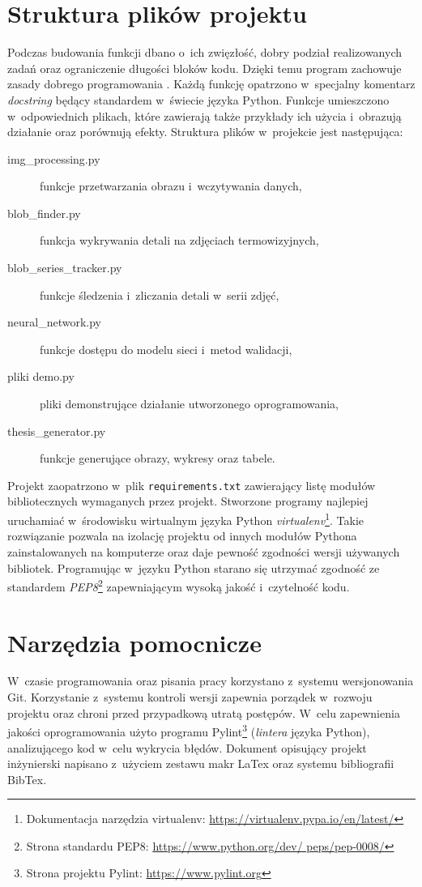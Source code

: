 \section{Struktura plików projektu}
Podczas budowania funkcji dbano o~ich zwięzłość, dobry podział realizowanych
zadań oraz ograniczenie długości bloków kodu.
Dzięki temu program zachowuje zasady dobrego programowania \cite{martin_code}.
Każdą funkcję opatrzono w~specjalny komentarz \emph{docstring} będący
standardem w~świecie języka Python.
Funkcje umieszczono w~odpowiednich plikach, które zawierają także
przykłady ich użycia i~obrazują działanie oraz porównują efekty.
Struktura plików w~projekcie jest następująca:
\begin{description}
	\item[img\_processing.py]
	funkcje przetwarzania obrazu i~wczytywania danych,
	\item[blob\_finder.py]
	funkcja wykrywania detali na zdjęciach termowizyjnych,
	\item[blob\_series\_tracker.py]
	funkcje śledzenia i~zliczania detali w~serii zdjęć,
	\item[neural\_network.py]
	funkcje dostępu do modelu sieci i~metod walidacji,
	\item[pliki demo.py]
	pliki demonstrujące działanie utworzonego oprogramowania,
	\item[thesis\_generator.py]
	funkcje generujące obrazy, wykresy oraz tabele.
\end{description}

Projekt zaopatrzono w~plik \texttt{requirements.txt} zawierający listę
modułów bibliotecznych wymaganych przez projekt.
Stworzone programy najlepiej uruchamiać w~środowisku wirtualnym języka
Python \emph{virtualenv}\footnote{Dokumentacja narzędzia virtualenv:
	\url{https://virtualenv.pypa.io/en/latest/}}.
Takie rozwiązanie pozwala na izolację projektu od innych modułów Pythona
zainstalowanych na komputerze oraz daje pewność zgodności wersji używanych
bibliotek.
Programując w~języku Python starano się utrzymać zgodność ze standardem
\emph{PEP8}\footnote{Strona standardu PEP8: \url{https://www.python.org/dev/
		peps/pep-0008/}} zapewniającym wysoką jakość i~czytelność kodu.

\section{Narzędzia pomocnicze}
W~czasie programowania oraz pisania pracy korzystano z~systemu wersjonowania
Git.
Korzystanie z~systemu kontroli wersji zapewnia porządek w~rozwoju projektu
oraz chroni przed przypadkową utratą postępów.
W~celu zapewnienia jakości oprogramowania użyto programu Pylint\footnote{
	Strona projektu Pylint: \url{https://www.pylint.org}} (\emph{lintera}
języka Python), analizującego kod w~celu wykrycia błędów.
Dokument opisujący projekt inżynierski napisano z~użyciem zestawu makr
LaTex oraz systemu bibliografii BibTex.

